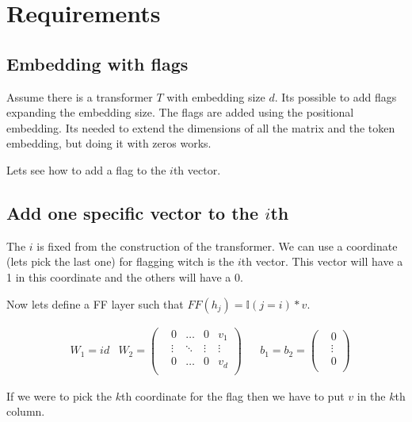 \section*{Requirements}

\subsection*{Embedding with flags}


Assume there is a transformer $T$ with embedding size $d$. Its possible to add flags expanding the embedding size. The flags are added using the positional embedding. Its needed to extend the dimensions of all the matrix and the token embedding, but doing it with zeros works.

Lets see how to add a flag to the $i$th vector.


\subsection*{Add one specific vector to the $i$th}

The $i$ is fixed from the construction of the transformer. We can use a coordinate (lets pick the last one) for flagging witch is the $i$th vector. This vector will have a 1 in this coordinate and the others  will have a 0.

Now lets define a FF layer such that $FF(h_j) = \mathbb{I}(j=i)*v$.

\begin{align*}
    & W_1 = id
    & W_2  = \left(\begin{matrix}
        & 0         &\dots  &0      & v_1       \\
        & \vdots    &\ddots &\vdots & \vdots    \\
        & 0         &\dots  &0      & v_d       \\
    \end{matrix}\right) &
    & b_1 = b_2 = \left(\begin{matrix}
        & 0      \\
        & \vdots \\
        & 0      \\
    \end{matrix}\right) 
\end{align*}

If we were to pick the $k$th coordinate for the flag then we have to put $v$ in the $k$th column.

